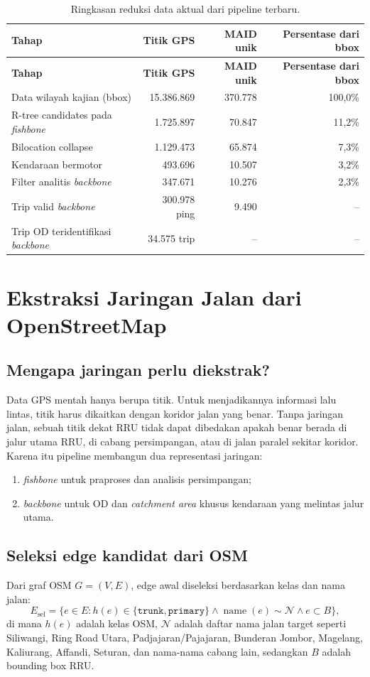 \documentclass[11pt,a4paper]{article}
\newcommand{\fishbone}{\textit{fishbone}}
\newcommand{\backbone}{\textit{backbone}}
\begin{document}
\begin{longtable}{lrrr}
\caption{Ringkasan reduksi data aktual dari pipeline terbaru.}\\
\toprule
\textbf{Tahap} & \textbf{Titik GPS} & \textbf{MAID unik} & \textbf{Persentase dari bbox}\\
\midrule
\endfirsthead
\toprule
\textbf{Tahap} & \textbf{Titik GPS} & \textbf{MAID unik} & \textbf{Persentase dari bbox}\\
\midrule
\endhead
Data wilayah kajian (bbox) & 15.386.869 & 370.778 & 100,0\%\\
R-tree candidates pada \fishbone{} & 1.725.897 & 70.847 & 11,2\%\\
Bilocation collapse & 1.129.473 & 65.874 & 7,3\%\\
Kendaraan bermotor & 493.696 & 10.507 & 3,2\%\\
Filter analitis \backbone{} & 347.671 & 10.276 & 2,3\%\\
Trip valid \backbone{} & 300.978 ping & 9.490 & --\\
Trip OD teridentifikasi \backbone{} & 34.575 trip & -- & --\\
\bottomrule
\end{longtable}

\section{Ekstraksi Jaringan Jalan dari OpenStreetMap}
\subsection{Mengapa jaringan perlu diekstrak?}
Data GPS mentah hanya berupa titik. Untuk menjadikannya informasi lalu lintas, titik harus dikaitkan dengan koridor jalan yang benar. Tanpa jaringan jalan, sebuah titik dekat RRU tidak dapat dibedakan apakah benar berada di jalur utama RRU, di cabang persimpangan, atau di jalan paralel sekitar koridor. Karena itu pipeline membangun dua representasi jaringan:
\begin{enumerate}
    \item \fishbone{} untuk praproses dan analisis persimpangan;
    \item \backbone{} untuk OD dan \textit{catchment area} khusus kendaraan yang melintas jalur utama.
\end{enumerate}

\subsection{Seleksi edge kandidat dari OSM}
Dari graf OSM $G=(V,E)$, edge awal diseleksi berdasarkan kelas dan nama jalan:
\[
E_{\text{sel}}=\{e\in E: h(e)\in\{\texttt{trunk},\texttt{primary}\}\land \operatorname{name}(e)\sim \mathcal{N}\land e\subset B\},
\]
di mana $h(e)$ adalah kelas OSM, $\mathcal{N}$ adalah daftar nama jalan target seperti Siliwangi, Ring Road Utara, Padjajaran/Pajajaran, Bunderan Jombor, Magelang, Kaliurang, Affandi, Seturan, dan nama-nama cabang lain, sedangkan $B$ adalah bounding box RRU.
\end{document}
